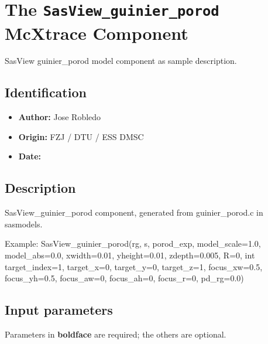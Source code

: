 \section{The \texttt{SasView\_guinier\_porod} McXtrace Component}
SasView guinier\_porod model component as sample description.

\subsection*{Identification}
\begin{itemize}
  \item \textbf{Author:} Jose Robledo
  \item \textbf{Origin:} FZJ / DTU / ESS DMSC
  \item \textbf{Date:} 
\end{itemize}

\subsection*{Description}
SasView\_guinier\_porod component, generated from guinier\_porod.c in sasmodels.

Example: SasView\_guinier\_porod(rg, s, porod\_exp, model\_scale=1.0, model\_abs=0.0, xwidth=0.01, yheight=0.01, zdepth=0.005, R=0, int target\_index=1, target\_x=0, target\_y=0, target\_z=1, focus\_xw=0.5, focus\_yh=0.5, focus\_aw=0, focus\_ah=0, focus\_r=0, pd\_rg=0.0)

\subsection*{Input parameters}
Parameters in \textbf{boldface} are required; the others are optional.


